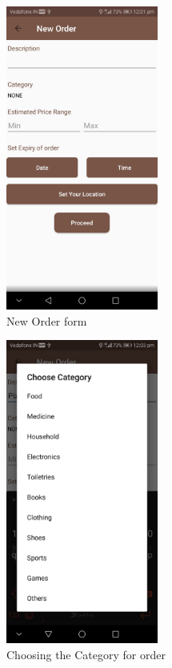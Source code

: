 \documentclass{report}
\begin{document}
\begin{figure}[h!]
\begin{subfigure}[h!]{.3\textwidth}
\centering
\includegraphics[width=5cm]{empty_form.jpg}
\caption{\centering \tiny New Order form}
\end{subfigure}
\begin{subfigure}[h!]{.3\textwidth}
\centering
\includegraphics[width=5cm]{categories.jpg}
\caption{\centering \tiny Choosing the Category for order}
\end{subfigure}
\begin{subfigure}[h!]{.3\textwidth}
\centering

\end{subfigure}
\end{figure}
\end{document}
